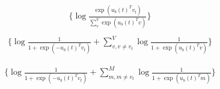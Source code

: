 \documentclass[11pt]{article}
\begin{document}
\begin{align*}
\Big\{ \log \frac{\exp(u_b(t)^Tv_t)}{\sum_v^V \exp(u_b(t)^Tv)} \Big\} \\
\end{align*}
\begin{align*}
\Big\{\log \frac{1}{1+\exp(-u_b(t)^Tv_t)} + \sum_{v,v\neq v_t}^V \log\frac{1}{1+\exp(u_b(t)^Tv)} \Big\} 
\end{align*}

\begin{align*}
\Big\{\log \frac{1}{1+\exp(-u_b(t)^Tv_t)} + \sum_{m, m\neq v_t}^M  \log\frac{1}{1+\exp(u_b(t)^Tm)} \Big\} 
\end{align*}
\end{document}
